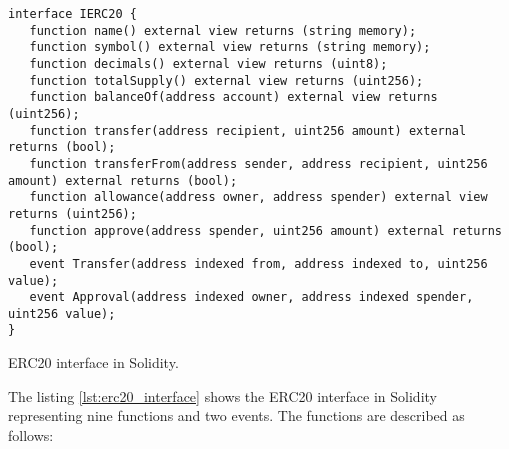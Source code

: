 \begin{listing}[!ht]
   \begin{verbatim}
interface IERC20 {
   function name() external view returns (string memory);
   function symbol() external view returns (string memory);
   function decimals() external view returns (uint8);
   function totalSupply() external view returns (uint256);
   function balanceOf(address account) external view returns (uint256);
   function transfer(address recipient, uint256 amount) external returns (bool);
   function transferFrom(address sender, address recipient, uint256 amount) external returns (bool);
   function allowance(address owner, address spender) external view returns (uint256);
   function approve(address spender, uint256 amount) external returns (bool);
   event Transfer(address indexed from, address indexed to, uint256 value);
   event Approval(address indexed owner, address indexed spender, uint256 value);
}
   \end{verbatim}
   \caption{ERC20 interface in Solidity.}
   \label{lst:erc20_interface}
\end{listing}


The listing \ref{lst:erc20_interface} shows the ERC20 interface in Solidity representing nine functions and two events. The functions are described as follows:



